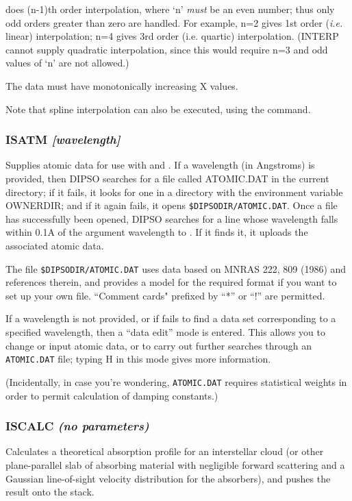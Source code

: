 \documentclass[twoside,11pt,noabs,nolof]{starlink}
\providecommand{\dipcom}[3]{\subsubsection*{\label{COM:#1}\xlabel{COM:#1}\textbf{#1} \emph{#2}}}
\begin{document}
  does (n-1)th order interpolation, where `n' \textit{must}\/ be an
even number; thus only odd orders greater than zero are handled.
For example, n=2 gives 1st order (\emph{i.e.} linear) interpolation;
n=4 gives 3rd order (i.e. quartic) interpolation. (INTERP cannot
supply quadratic interpolation, since this would require n=3 and odd
values of `n' are not allowed.)

The data must have monotonically increasing X values.

Note that spline interpolation can also be executed, using the 
command.

\dipcom{ISATM}{[wavelength]}{Reads atomic data from a disk file for use with {\texttt{ISCALC}} and {\texttt{ISCOG}}}
Supplies atomic data for use with   and .  If a wavelength (in
Angstroms) is provided, then DIPSO searches for a file called ATOMIC.DAT in the
current directory; if it fails, it looks for one in a directory with the
environment variable OWNERDIR; and if it again fails, it opens
{\texttt{\$DIPSODIR/ATOMIC.DAT}}.  Once a
file has successfully been opened, DIPSO searches for a line whose wavelength
falls within 0.1A of the argument wavelength to .  If it finds it, it
uploads the associated atomic data.

The file {\texttt{\$DIPSODIR/ATOMIC.DAT}}  uses data based on MNRAS 222, 809 (1986)
and references therein, and provides a model for the required format
if you want to set up your own file.
``Comment cards" prefixed by ``*'' or ``!'' are permitted.

If a wavelength is not provided, or if   fails to find a data set
corresponding to a specified wavelength, then a ``data edit'' mode is
entered. This allows you to change or input atomic data, or to carry
out further searches through an {\texttt{ATOMIC.DAT}}  file; typing H in
this mode gives more information.

(Incidentally, in case you're wondering, {\texttt{ATOMIC.DAT}}  requires
statistical weights in order to permit calculation of damping
constants.)

\dipcom{ISCALC}{(no parameters)}{Creates a theoretical absorption profile for an interstellar cloud}
Calculates a theoretical absorption profile for an interstellar cloud
(or other plane-parallel slab of absorbing material with negligible
forward scattering and a Gaussian line-of-sight velocity distribution
for the absorbers), and pushes the result onto the stack.
\end{document}
